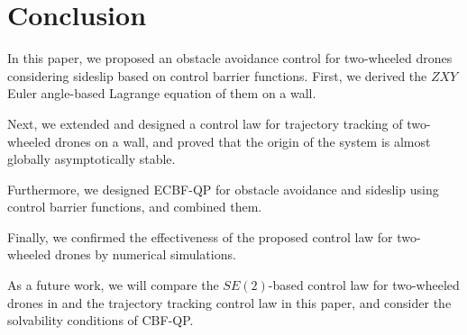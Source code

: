 \section{Conclusion}
In this paper, we proposed an obstacle avoidance control for two-wheeled drones considering sideslip based on control barrier functions.
First, we derived the $ ZXY $ Euler angle-based Lagrange equation of them on a wall.

Next, we extended \cite{rodriguez-cortesNewGeometricTrajectory2022} and designed a control law for trajectory tracking of two-wheeled drones on a wall, and proved that the origin of the system is almost globally asymptotically stable.

Furthermore, we designed ECBF-QP for obstacle avoidance and sideslip using control barrier functions, and combined them.

Finally, we confirmed the effectiveness of the proposed control law for two-wheeled drones by numerical simulations.

As a future work, we will compare the $ SE(2) $-based control law for two-wheeled drones in \cite{morteza2017logarithmic} and the trajectory tracking control law in this paper, and consider the solvability conditions of CBF-QP.